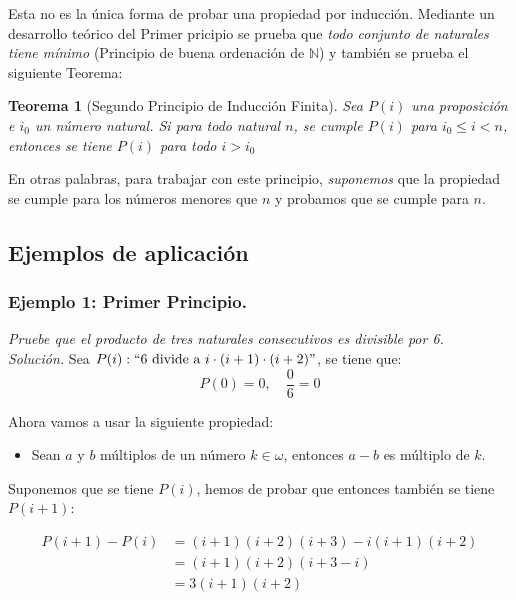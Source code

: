 \documentclass[a4paper]{article}
\theoremstyle{plain} \newtheorem{PrimerPrincipio}{Teorema}
\theoremstyle{plain} \newtheorem{SegundoPrincipio}{Teorema}
\begin{document}
Esta no es la única forma de probar una propiedad por inducción. Mediante un desarrollo teórico del Primer pricipio se prueba que \emph{todo conjunto de naturales tiene mínimo } (Principio de buena ordenación de $\mathbb{N}$) y también se prueba el siguiente Teorema:

\begin{SegundoPrincipio}[Segundo Principio de Inducción Finita]
				Sea $P(i)$ una proposición e $i_0$ un número natural. Si para todo natural $n$, se cumple $P(i)$ para $i_0 \le i < n$, entonces se tiene $P(i)$ para todo $i > i_0$
\end{SegundoPrincipio}

En otras palabras, para trabajar con este principio, \emph{suponemos} que la propiedad se cumple para los números menores que $n$ y probamos que se cumple para $n$.

\subsection{Ejemplos de aplicación}

\subsubsection*{Ejemplo 1: Primer Principio.} \emph{Pruebe que el producto de tres naturales consecutivos es divisible por 6.}\\

\emph{Solución.} Sea $P(i): ``6 \text{ divide a } i\cdot(i+1)\cdot(i+2)"$, se tiene que:
\begin{equation*} \tag{Caso base}
	P(0) = 0,\quad \frac{0}{6}=0
\end{equation*}

Ahora vamos a usar la siguiente propiedad:
\begin{itemize}
				\item Sean $a$ y $b$ múltiplos de un número $k \in \omega$, entonces $a - b$ es múltiplo de $k$.
\end{itemize}

Suponemos que se tiene $P(i)$, hemos de probar que entonces también se tiene $P(i+1)$:

\begin{align*}
				P(i+1) - P(i) &{}=  (i+1)(i+2)(i+3) - i(i+1)(i+2)\\
											 &= (i+1)(i+2)(i + 3 - i)\\
											 &= 3(i+1)(i+2)
\end{align*}
\end{document}
